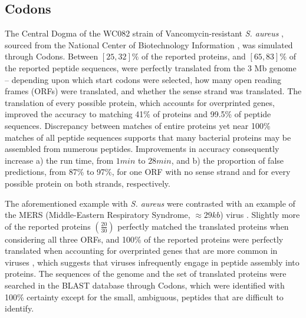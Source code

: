\subsection{Codons}
The Central Dogma of the WC082 strain of Vancomycin-resistant \textit{S. aureus} \cite{Cong2020VancomycinFeatures}, sourced from the National Center of Biotechnology Information \cite{Haas2022StaphylococcusGenome}, was simulated through Codons. Between $[25,32]\%$ of the reported proteins, and $[65,83]\%$ of the reported peptide sequences, were perfectly translated from the 3 Mb genome -- depending upon which start codons were selected, how many open reading frames (ORFs) were translated, and whether the sense strand was translated. The translation of every possible protein, which accounts for overprinted genes, improved the accuracy to matching 41\% of proteins and 99.5\% of peptide sequences. Discrepancy between matches of entire proteins yet near 100\% matches of all peptide sequences supports that many bacterial proteins may be assembled from numerous peptides. Improvements in accuracy consequently increase a) the run time, from $1 min$ to $28 min$, and b) the proportion of false predictions, from 87\% to 97\%, for one ORF with no sense strand and for every possible protein on both strands, respectively. 

The aforementioned example with \textit{S. aureus} were contrasted with an example of the MERS (Middle-Eastern Respiratory Syndrome, $\approx 29kb$) virus \cite{Enouf2013MiddleGenome}. Slightly more of the reported proteins $\left(\frac{20}{30}\right)$ perfectly matched the translated proteins when considering all three ORFs, and 100\% of the reported proteins were perfectly translated when accounting for overprinted genes that are more common in viruses \cite{Ho2021UnconventionalTargets}, which suggests that viruses infrequently engage in peptide assembly into proteins. The sequences of the genome and the set of translated proteins were searched in the BLAST database through Codons, which were identified with 100\% certainty except for the small, ambiguous, peptides that are difficult to identify. 

